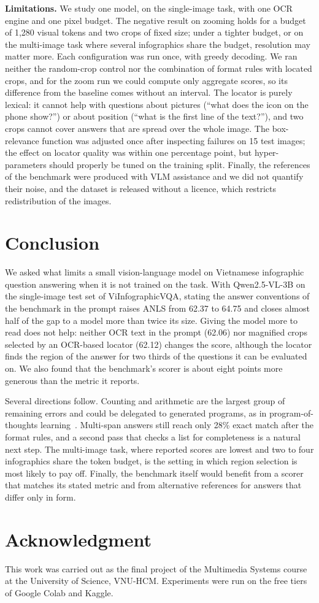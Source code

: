 \documentclass[conference]{IEEEtran}
\begin{document}
\textbf{Limitations.} We study one model, on the single-image task, with one OCR engine and one pixel budget. The negative result on zooming holds for a budget of 1{,}280 visual tokens and two crops of fixed size; under a tighter budget, or on the multi-image task where several infographics share the budget, resolution may matter more. Each configuration was run once, with greedy decoding. We ran neither the random-crop control nor the combination of format rules with located crops, and for the zoom run we could compute only aggregate scores, so its difference from the baseline comes without an interval. The locator is purely lexical: it cannot help with questions about pictures (``what does the icon on the phone show?'') or about position (``what is the first line of the text?''), and two crops cannot cover answers that are spread over the whole image. The box-relevance function was adjusted once after inspecting failures on 15 test images; the effect on locator quality was within one percentage point, but hyper-parameters should properly be tuned on the training split. Finally, the references of the benchmark were produced with VLM assistance and we did not quantify their noise, and the dataset is released without a licence, which restricts redistribution of the images.

\section{Conclusion}
We asked what limits a small vision-language model on Vietnamese infographic question answering when it is not trained on the task. With Qwen2.5-VL-3B on the single-image test set of ViInfographicVQA, stating the answer conventions of the benchmark in the prompt raises ANLS from 62.37 to 64.75 and closes almost half of the gap to a model more than twice its size. Giving the model more to read does not help: neither OCR text in the prompt (62.06) nor magnified crops selected by an OCR-based locator (62.12) changes the score, although the locator finds the region of the answer for two thirds of the questions it can be evaluated on. We also found that the benchmark's scorer is about eight points more generous than the metric it reports.

Several directions follow. Counting and arithmetic are the largest group of remaining errors and could be delegated to generated programs, as in program-of-thoughts learning~\cite{tinychart}. Multi-span answers still reach only 28\% exact match after the format rules, and a second pass that checks a list for completeness is a natural next step. The multi-image task, where reported scores are lowest and two to four infographics share the token budget, is the setting in which region selection is most likely to pay off. Finally, the benchmark itself would benefit from a scorer that matches its stated metric and from alternative references for answers that differ only in form.

\section*{Acknowledgment}
This work was carried out as the final project of the Multimedia Systems course at the University of Science, VNU-HCM. Experiments were run on the free tiers of Google Colab and Kaggle.



\end{document}
